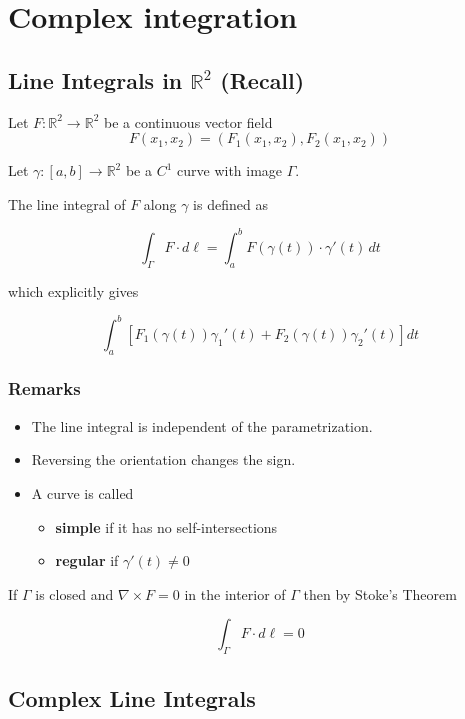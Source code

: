 

\chapter{Complex integration}\label{chap:complex_integration}

\section{Line Integrals in $\mathbb{R}^2$ (Recall)}

Let $F : \mathbb{R}^2 \rightarrow \mathbb{R}^2$ be a continuous vector field
\[
F(x_1,x_2) = (F_1(x_1,x_2),F_2(x_1,x_2))
\]

Let $\gamma : [a,b] \rightarrow \mathbb{R}^2$ be a $C^1$ curve with image $\Gamma$.

The line integral of $F$ along $\gamma$ is defined as

\[
\int_\Gamma F \cdot d\ell
=
\int_a^b F(\gamma(t)) \cdot \gamma'(t)\,dt
\]

which explicitly gives

\[
\int_a^b \left[
F_1(\gamma(t))\gamma_1'(t) +
F_2(\gamma(t))\gamma_2'(t)
\right]dt
\]

\subsection*{Remarks}

\begin{itemize}
\item The line integral is independent of the parametrization.
\item Reversing the orientation changes the sign.
\item A curve is called
\begin{itemize}
\item \textbf{simple} if it has no self-intersections
\item \textbf{regular} if $\gamma'(t) \neq 0$
\end{itemize}
\end{itemize}

If $\Gamma$ is closed and $\nabla \times F = 0$ in the interior of $\Gamma$ then by Stoke's Theorem

\[
\int_\Gamma F \cdot d\ell = 0
\]

\section{Complex Line Integrals}

